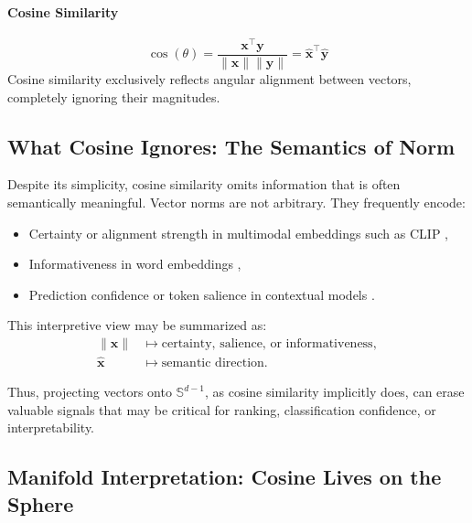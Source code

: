 \documentclass[11pt]{article}
\begin{document}
\paragraph{Cosine Similarity}
\begin{equation*}
	\cos(\theta) = \frac{\mathbf{x}^\top \mathbf{y}}{\|\mathbf{x}\| \|\mathbf{y}\|} = \hat{\mathbf{x}}^\top \hat{\mathbf{y}}
\end{equation*}
Cosine similarity exclusively reflects angular alignment between vectors, completely ignoring their magnitudes.


\subsection{What Cosine Ignores: The Semantics of Norm}

Despite its simplicity, cosine similarity omits information that is often semantically meaningful. Vector norms are not arbitrary. They frequently encode:

\begin{itemize}
	\setlength\leftskip{-1em} 
	\item {Certainty} or alignment strength in multimodal embeddings such as \textsc{CLIP} ,
	\item {Informativeness} in word embeddings \citep{oyama_2023_NormWordEmbedding}, 
	\item {Prediction confidence} or token salience in contextual models \citep{gao_2021_SimCSESimpleContrastive}.
\end{itemize}

This interpretive view may be summarized as:
\begin{align*}
	\|\mathbf{x}\| &\longmapsto \text{certainty, salience, or informativeness}, \\
	\hat{\mathbf{x}} &\longmapsto \text{semantic direction}.
\end{align*}

Thus, projecting vectors onto $\mathbb{S}^{d-1}$, as cosine similarity implicitly does, can erase valuable signals that may be critical for ranking, classification confidence, or interpretability.


\subsection{Manifold Interpretation: Cosine Lives on the Sphere}
\end{document}
